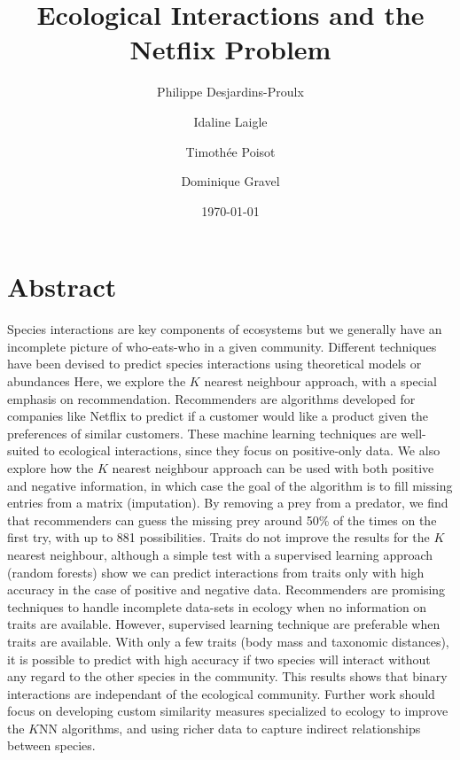\documentclass[letterpaper]{article}
\begin{document}
\title{Ecological Interactions and the Netflix Problem}
\author[0,1,2]{Philippe Desjardins-Proulx}
\author[1]{Idaline Laigle}
\author[2]{Timothée Poisot}
\author[1]{Dominique Gravel}
\date{\today}
\maketitle

\section{Abstract}

Species interactions are key components of ecosystems but we generally have an
incomplete picture of who-eats-who in a given community. Different techniques
have been devised to predict species interactions using theoretical models or
abundances %
Here, we explore the $K$ nearest neighbour approach, with a special
emphasis on recommendation. Recommenders are algorithms developed for companies
like Netflix to predict if a customer would like a product given the
preferences of similar customers. These machine learning techniques are
well-suited to ecological interactions, since they focus on positive-only data.
We also explore how the $K$ nearest neighbour approach can be used with both
positive and negative information, in which case the goal of the algorithm is
to fill missing entries from a matrix (imputation). By removing a prey from a
predator, we find that recommenders can guess the missing prey around 50\% of
the times on the first try, with up to 881 possibilities. Traits do not improve
the results for the $K$ nearest neighbour, although a simple test with a
supervised learning approach (random forests) show we can predict interactions
from traits only with high accuracy in the case of positive and negative data.
Recommenders are promising techniques to handle incomplete data-sets in ecology
when no information on traits are available. However, supervised learning
technique are preferable when traits are available. With only a few traits
(body mass and taxonomic distances), it is possible to predict with high
accuracy if two species will interact without any regard to the other species
in the community. This results shows that binary interactions are independant %
of the ecological community. Further work should focus on developing custom
similarity measures specialized to ecology to improve the $K$NN algorithms,
and using richer data to capture indirect relationships between species.
\end{document}
